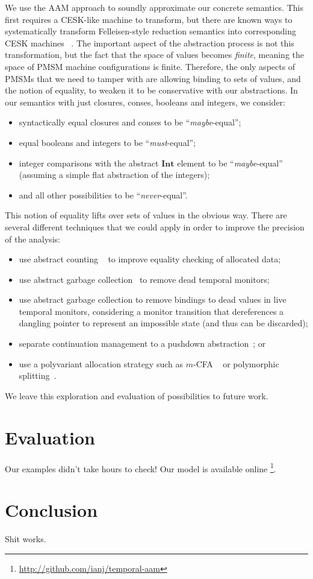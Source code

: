 We use the AAM approach to soundly approximate our concrete semantics.
%
This first requires a CESK-like machine to transform, but there are known ways to systematically transform Felleisen-style reduction semantics into corresponding CESK machines ~\citep{?}.
%
The important aspect of the abstraction process is not this transformation, but the fact that the space of values becomes \emph{finite}, meaning the space of PMSM machine configurations is finite.
%
Therefore, the only aspects of PMSMs that we need to tamper with are allowing binding to sets of values, and the notion of equality, to weaken it to be conservative with our abstractions.
%
In our semantics with just closures, conses, booleans and integers, we consider:
\begin{itemize}
 \item syntactically equal closures and conses to be ``\emph{maybe}-equal'';
 \item equal booleans and integers to be ``\emph{must}-equal'';
 \item integer comparisons with the abstract $\mathbf{Int}$ element to be ``\emph{maybe}-equal'' (assuming a simple flat abstraction of the integers);
 \item and all other possibilities to be ``\emph{never}-equal''.
\end{itemize}
%
This notion of equality lifts over sets of values in the obvious way.
%
There are several different techniques that we could apply in order to improve the precision of the analysis:
\begin{itemize}
\item{use abstract counting ~\citep{dvanhorn:Might:2006:GammaCFA} to improve equality checking of allocated data;}
\item{use abstract garbage collection~\citep{dvanhorn:Might:2006:GammaCFA} to remove dead temporal monitors;}
\item{use abstract garbage collection to remove bindings to dead values in live temporal monitors, considering a monitor transition that dereferences a dangling pointer to represent an impossible state (and thus can be discarded);}
\item{separate continuation management to a pushdown abstraction~\citep{dvanhorn:Vardoulakis2011CFA2}; or}
\item{use a polyvariant allocation strategy such as $m$-CFA ~\citep{dvanhorn:Might2010Resolving} or polymorphic splitting~\citep{dvanhorn:wright-jagannathan-toplas98}.}
\end{itemize}
%
We leave this exploration and evaluation of possibilities to future work.

\section{Evaluation}

Our examples didn't take hours to check!
%
Our model is available online \footnote{\url{http://github.com/ianj/temporal-aam}}.

\section{Conclusion}

Shit works.
